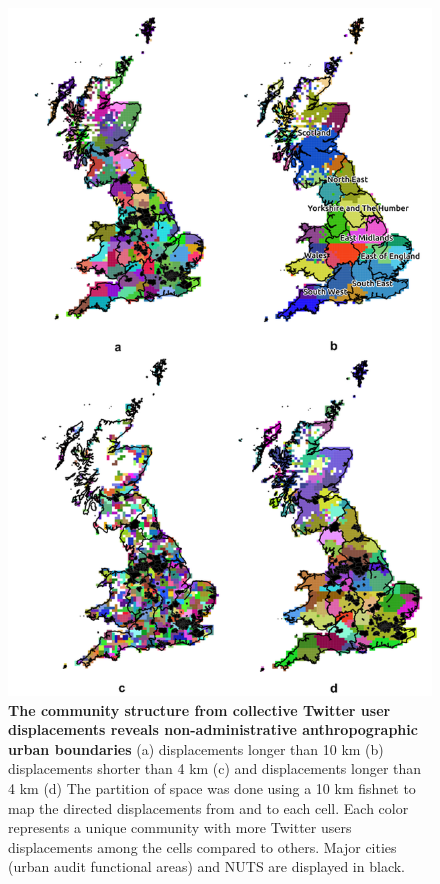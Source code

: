 \documentclass[10pt,letterpaper]{article}
\begin{document}
\begin{figure}[ht]
\includegraphics[width=0.9\linewidth]{./figure/PNG/S5_community}
\caption{{\bf The community structure from collective Twitter user displacements reveals non-administrative anthropographic urban boundaries} (a) displacements longer than 10 km (b) displacements shorter than 4 km (c) and displacements longer than 4 km (d) The partition of space was done using a 10 km fishnet to map the directed displacements from and to each cell. Each color represents a unique community with more Twitter users displacements among the cells compared to others. Major cities (urban audit functional areas) and NUTS are displayed in black.}
\label{S5_Fig}
\end{figure}
\end{document}
